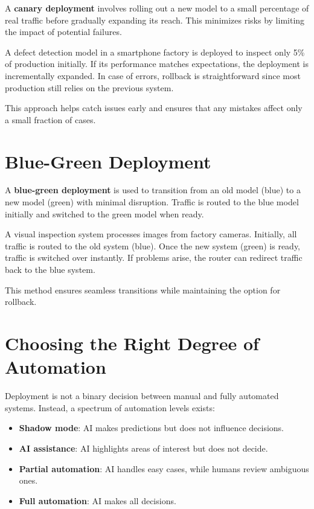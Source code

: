 \documentclass[12pt,openany]{book}
\begin{document}
A \textbf{canary deployment} involves rolling out a new model to a small percentage of real traffic before gradually expanding its reach. This minimizes risks by limiting the impact of potential failures.

\begin{examplebox}
   A defect detection model in a smartphone factory is deployed to inspect only 5\% of production initially. If its performance matches expectations, the deployment is incrementally expanded. In case of errors, rollback is straightforward since most production still relies on the previous system.
\end{examplebox}

This approach helps catch issues early and ensures that any mistakes affect only a small fraction of cases.



\section{Blue-Green Deployment}

A \textbf{blue-green deployment} is used to transition from an old model (blue) to a new model (green) with minimal disruption. Traffic is routed to the blue model initially and switched to the green model when ready.

\begin{examplebox}
   A visual inspection system processes images from factory cameras. Initially, all traffic is routed to the old system (blue). Once the new system (green) is ready, traffic is switched over instantly. If problems arise, the router can redirect traffic back to the blue system.
\end{examplebox}

This method ensures seamless transitions while maintaining the option for rollback.



\section{Choosing the Right Degree of Automation}

Deployment is not a binary decision between manual and fully automated systems. Instead, a spectrum of automation levels exists:

\begin{itemize}
    \item \textbf{Shadow mode}: AI makes predictions but does not influence decisions.
    \item \textbf{AI assistance}: AI highlights areas of interest but does not decide.
    \item \textbf{Partial automation}: AI handles easy cases, while humans review ambiguous ones.
    \item \textbf{Full automation}: AI makes all decisions.
\end{itemize}
\end{document}
